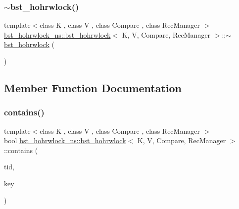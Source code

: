 \mbox{\label{classbst__hohrwlock__ns_1_1bst__hohrwlock_a2b5b098a27a55fdcf511c37e1f74fa1d}} 
\subsubsection{\texorpdfstring{$\sim$bst\+\_\+hohrwlock()}{~bst\_hohrwlock()}}
{\footnotesize\ttfamily template$<$class K , class V , class Compare , class Rec\+Manager $>$ \\
\hyperlink{classbst__hohrwlock__ns_1_1bst__hohrwlock}{bst\+\_\+hohrwlock\+\_\+ns\+::bst\+\_\+hohrwlock}$<$ K, V, Compare, Rec\+Manager $>$\+::$\sim$\hyperlink{classbst__hohrwlock__ns_1_1bst__hohrwlock}{bst\+\_\+hohrwlock} (\begin{DoxyParamCaption}{ }\end{DoxyParamCaption})\hspace{0.3cm}{\ttfamily [inline]}}



\subsection{Member Function Documentation}
\mbox{\label{classbst__hohrwlock__ns_1_1bst__hohrwlock_a44fc6dba42ab1f4ea18d6576863c5171}} 
\subsubsection{\texorpdfstring{contains()}{contains()}}
{\footnotesize\ttfamily template$<$class K , class V , class Compare , class Rec\+Manager $>$ \\
bool \hyperlink{classbst__hohrwlock__ns_1_1bst__hohrwlock}{bst\+\_\+hohrwlock\+\_\+ns\+::bst\+\_\+hohrwlock}$<$ K, V, Compare, Rec\+Manager $>$\+::contains (\begin{DoxyParamCaption}\item[{const int}]{tid,  }\item[{const K \&}]{key }\end{DoxyParamCaption})\hspace{0.3cm}{\ttfamily [inline]}}

